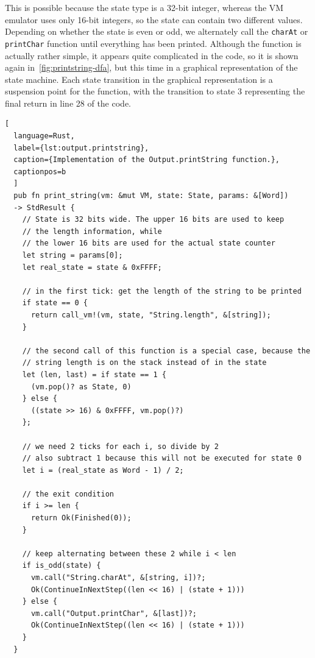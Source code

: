 This is possible because the state type is a 32-bit integer, whereas the VM emulator uses only 16-bit integers, so the state can contain two different values.
Depending on whether the state is even or odd, we alternately call the \verb+charAt+ or \verb+printChar+ function until everything has been printed.
Although the function is actually rather simple, it appears quite complicated in the code, so it is shown again in~\cref{fig:printstring-dfa}, but this time in a graphical representation of the state machine.
Each state transition in the graphical representation is a suspension point for the function, with the transition to state \(3\) representing the final return in line 28 of the code.

\begin{lstlisting}[
  language=Rust,
  label={lst:output.printstring},
  caption={Implementation of the Output.printString function.},
  captionpos=b
  ]
  pub fn print_string(vm: &mut VM, state: State, params: &[Word])
  -> StdResult {
    // State is 32 bits wide. The upper 16 bits are used to keep
    // the length information, while
    // the lower 16 bits are used for the actual state counter
    let string = params[0];
    let real_state = state & 0xFFFF;

    // in the first tick: get the length of the string to be printed
    if state == 0 {
      return call_vm!(vm, state, "String.length", &[string]);
    }

    // the second call of this function is a special case, because the
    // string length is on the stack instead of in the state
    let (len, last) = if state == 1 {
      (vm.pop()? as State, 0)
    } else {
      ((state >> 16) & 0xFFFF, vm.pop()?)
    };

    // we need 2 ticks for each i, so divide by 2
    // also subtract 1 because this will not be executed for state 0
    let i = (real_state as Word - 1) / 2;

    // the exit condition
    if i >= len {
      return Ok(Finished(0));
    }

    // keep alternating between these 2 while i < len
    if is_odd(state) {
      vm.call("String.charAt", &[string, i])?;
      Ok(ContinueInNextStep((len << 16) | (state + 1)))
    } else {
      vm.call("Output.printChar", &[last])?;
      Ok(ContinueInNextStep((len << 16) | (state + 1)))
    }
  }
\end{lstlisting}

